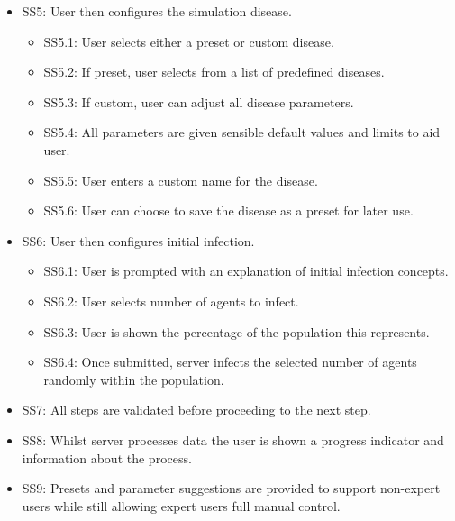 \begin{itemize}
\begin{itemize}
        \item\label{req:SS4.2} SS4.2: Population of each role is constrained to supported limits based on map data.
        \item\label{req:SS4.3} SS4.3: Population split is prefilled to aid user based on map area demographics.
        \item\label{req:SS4.4} SS4.4: User can adjust population of each role.
        \item\label{req:SS4.5} SS4.5: Once submitted the server generates a synthetic population (including health data and routines) based on the selected parameters, with progress feedback shown to the user.
    \end{itemize}
    \item\label{req:SS5} SS5: User then configures the simulation disease.
    \begin{itemize}
        \item\label{req:SS5.1} SS5.1: User selects either a preset or custom disease.
        \item\label{req:SS5.2} SS5.2: If preset, user selects from a list of predefined diseases.
        \item\label{req:SS5.3} SS5.3: If custom, user can adjust all disease parameters.
        \item\label{req:SS5.4} SS5.4: All parameters are given sensible default values and limits to aid user.
        \item\label{req:SS5.5} SS5.5: User enters a custom name for the disease.
        \item\label{req:SS5.6} SS5.6: User can choose to save the disease as a preset for later use.
    \end{itemize}
    \item\label{req:SS6} SS6: User then configures initial infection.
    \begin{itemize}
        \item\label{req:SS6.1} SS6.1: User is prompted with an explanation of initial infection concepts.
        \item\label{req:SS6.2} SS6.2: User selects number of agents to infect.
        \item\label{req:SS6.3} SS6.3: User is shown the percentage of the population this represents.
        \item\label{req:SS6.4} SS6.4: Once submitted, server infects the selected number of agents randomly within the population.
    \end{itemize}
    \item\label{req:SS7} SS7: All steps are validated before proceeding to the next step.
    \item\label{req:SS8} SS8: Whilst server processes data the user is shown a progress indicator and information about the process.
    \item\label{req:SS9} SS9: Presets and parameter suggestions are provided to support non-expert users while still allowing expert users full manual control.
\end{itemize}

